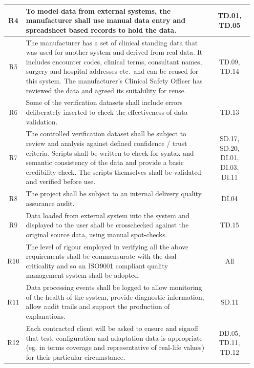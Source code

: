 \begin{longtable}{|C{}|L{}|C{}|}
  \hline
  R4 & To model data from external systems, the manufacturer shall use manual data entry and spreadsheet based records to hold the data. & TD.01, TD.05\\
  \hline
  R5 & The manufacturer has a set of clinical standing data that was used for another system and derived from real data.
  It includes encounter codes, clinical terms, consultant names, surgery and hospital addresses etc.\ and can be reused for this system. The manufacturer's Clinical Safety Officer has reviewed the data and agreed its suitability for reuse. & TD.09, TD.14\\
  \hline
  R6 & Some of the \gls{verification} \glspl{dataset} shall include errors deliberately inserted to check the effectiveness of data \gls{validation}. & TD.13\\
  \hline
  R7 & The controlled \gls{verification} \gls{dataset} shall be subject to review and analysis against defined confidence / trust criteria. Scripts shall be written to check for syntax and semantic \gls{consistency} of the data and provide a basic  credibility check. The scripts themselves shall be validated and verified before use. & SD.17, SD.20, DI.01, DI.03, DI.11\\
  \hline
  R8 & The project shall be subject to an internal delivery quality assurance audit. & DI.04\\
  \hline
  R9 & Data loaded from external system into the system and displayed to the user shall be crosschecked against the original source data, using manual spot-checks. & TD.15\\
  \hline
  R10 & The level of rigour employed in verifying all the above requirements shall be commensurate with the \gls{dsal} \gls{criticality} and so an ISO9001 compliant quality management system shall be adopted. & All\\
  \hline
  R11 & Data processing events shall be logged to allow monitoring of the health of the system, provide diagnostic \gls{information}, allow audit trails and support the production of explanations. & SD.11\\
  \hline
  R12 & Each contracted client will be asked to ensure and signoff that test, configuration and adaptation data is appropriate (eg. in terms coverage and representative of real-life values) for their particular circumstance. & DD.05, TD.11, TD.12\\
  \hline
\end{longtable}

